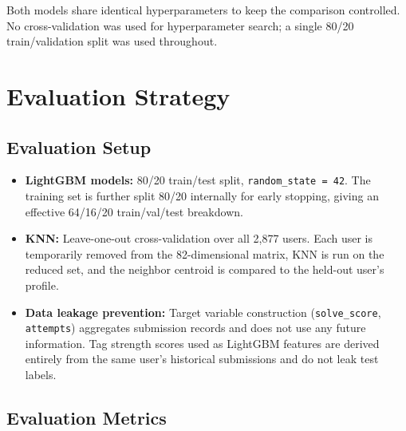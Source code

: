 \documentclass[12pt,a4paper]{article}
\begin{document}
Both models share identical hyperparameters to keep the comparison controlled.
No cross-validation was used for hyperparameter search; a single 80/20
train/validation split was used throughout.

\section{Evaluation Strategy}

\subsection*{Evaluation Setup}

\begin{itemize}
    \item \textbf{LightGBM models:} 80/20 train/test split,
          \texttt{random\_state = 42}. The training set is further split 80/20
          internally for early stopping, giving an effective 64/16/20
          train/val/test breakdown.
    \item \textbf{KNN:} Leave-one-out cross-validation over all 2,877 users.
          Each user is temporarily removed from the 82-dimensional matrix,
          KNN is run on the reduced set, and the neighbor centroid is compared
          to the held-out user's profile.
    \item \textbf{Data leakage prevention:} Target variable construction
          (\texttt{solve\_score}, \texttt{attempts}) aggregates submission
          records and does not use any future information. Tag strength scores
          used as LightGBM features are derived entirely from the same user's
          historical submissions and do not leak test labels.
\end{itemize}

\subsection*{Evaluation Metrics}
\end{document}
